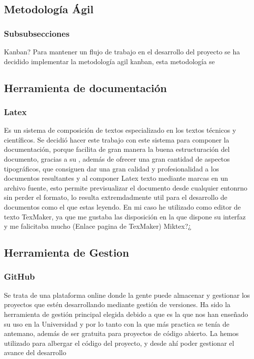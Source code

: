 
\subsection{Metodología Ágil}

\subsubsection{Subsubsecciones}
Kanban?
Para mantener un flujo de trabajo en el desarrollo del proyecto se ha decidido implementar la metodología agil kanban, esta metodología se 



\subsection{Herramienta de documentación}

\subsubsection{Latex}

Es un sistema de composición de textos especializado en los textos técnicos y científicos.
Se decidió hacer este trabajo con este sistema para componer la documentación, porque facilita de gran manera la buena estructuración del documento, gracias a su , además de ofrecer una gran cantidad de aspectos tipográficos, que consiguen dar una gran calidad y profesionalidad a los documentos resultantes y al componer Latex texto mediante marcas en un archivo fuente, esto permite previsualizar el documento desde cualquier entonrno sin perder el formato, lo resulta extremdadmente util para el desarrollo de documentos como el que estas leyendo.
En mi caso he utilizado como editor de texto TexMaker, ya que me gustaba las disposición en la que dispone su interfaz y me falicitaba mucho (Enlace pagina de TexMaker)
Miktex?¿

\subsection{Herramienta de Gestion }

\subsubsection{GitHub}

Se trata de una plataforma online donde la gente puede almacenar y gestionar los proyectos que estén desarrollando mediante gestión de versiones.
Ha sido la herramienta de gestión principal elegida debido a que es la que nos han enseñado su uso en la Universidad y por lo tanto con la que más practica se tenía de antemano, además de ser gratuita para proyectos de código abierto.
 La hemos utilizado para albergar el código del proyecto, y desde ahí poder gestionar el avance del desarrollo


